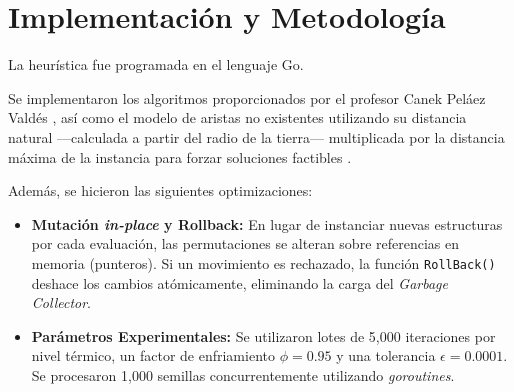 \documentclass[12pt,letterpaper]{article}
\begin{document}
\section{Implementación y Metodología}
La heurística fue programada en el lenguaje Go.

Se implementaron los algoritmos proporcionados por el profesor Canek Peláez Valdés \cite{notas_ta}, así como el modelo de aristas no existentes utilizando su distancia natural —calculada a partir del radio de la tierra— multiplicada por la distancia máxima de la instancia para forzar soluciones factibles \cite{notas_tsp}.

Además, se hicieron las siguientes optimizaciones:

\begin{itemize}
    \item \textbf{Mutación \textit{in-place} y Rollback:} En lugar de instanciar nuevas estructuras por cada evaluación, las permutaciones se alteran sobre referencias en memoria (punteros). Si un movimiento es rechazado, la función \texttt{RollBack()} deshace los cambios atómicamente, eliminando la carga del \textit{Garbage Collector}.
    \item \textbf{Parámetros Experimentales:} Se utilizaron lotes de 5,000 iteraciones por nivel térmico, un factor de enfriamiento $\phi = 0.95$ y una tolerancia $\epsilon = 0.0001$. Se procesaron 1,000 semillas concurrentemente utilizando \textit{goroutines}.
\end{itemize}
\end{document}

